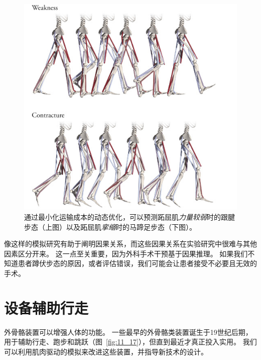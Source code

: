 \begin{figure}[!htb]
	\centering
	\includegraphics[width=0.8\linewidth]{chap11/11_16}
	\caption{通过最小化运输成本的动态优化，可以预测跖屈肌\textit{力量较弱}时的跟腱步态（上图）以及跖屈肌\textit{挛缩}时的马蹄足步态（下图）\cite{ong2019predicting}。 \label{fig:11_16}}
\end{figure}


像这样的模拟研究有助于阐明因果关系，而这些因果关系在实验研究中很难与其他因素区分开来。
这一点至关重要，因为外科手术干预基于因果推理。
如果我们不知道患者蹲伏步态的原因，或者评估错误，我们可能会让患者接受不必要且无效的手术。


\section{设备辅助行走}

外骨骼装置可以增强人体的功能。
一些最早的外骨骼类装置诞生于19世纪后期，用于辅助行走、跑步和跳跃（图~\ref{fig:11_17}），但直到最近才真正投入实用。
我们可以利用肌肉驱动的模拟来改进这些装置，并指导新技术的设计。


